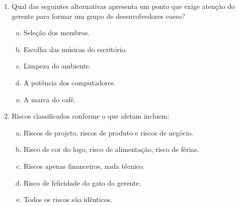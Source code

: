 \documentclass{beamer}
\begin{document}
\begin{frame}
    \begin{enumerate}
        \justifying
        \setcounter{enumi}{8}
        \item<1-2> Qual das seguintes alternativas apresenta um ponto que exige atenção do gerente para formar um grupo de desenvolvedores coeso?
        \begin{enumerate}[a)]
            \justifying
            \item<1-2> \alert<2>{Seleção dos membros}.
            \item<1-2> Escolha das músicas do escritório.
            \item<1-2> Limpeza do ambiente.
            \item<1-2> A potência dos computadores.
            \item<1-2> A marca do café.
        \end{enumerate}
        \item<3-4> Riscos classificados conforme o que afetam incluem:
        \begin{enumerate}[a)]
            \justifying
            \item<3-4> \alert<4>{Riscos de projeto, riscos de produto e riscos de negócio}.
            \item<3-4> Risco de cor do logo, risco de alimentação, risco de férias.
            \item<3-4> Riscos apenas financeiros, nada técnico.
            \item<3-4> Risco de felicidade do gato do gerente.
            \item<3-4> Todos os riscos são idênticos.
        \end{enumerate}
    \end{enumerate}
\end{frame}
\end{document}
